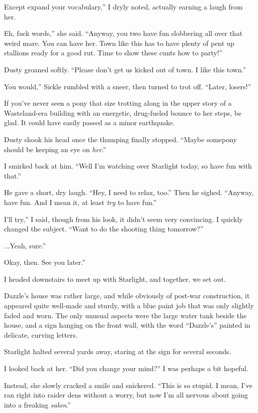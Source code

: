 \leavevmode{}Except expand your vocabulary,” I dryly noted, actually earning a laugh from her.

\leavevmode{}Eh, fuck words,” she said. “Anyway, you two have fun slobbering all over that weird mare. You can have her. Town like this has to have plenty of pent up stallions ready for a good rut. Time to show these cunts how to party!”

Dusty groaned softly. “Please don’t get us kicked out of town. I like this town.”

\leavevmode{}You would,” Sickle rumbled with a sneer, then turned to trot off. “Later, losers!”

If you’ve never seen a pony that size trotting along in the upper story of a Wasteland-era building with an energetic, drug-fueled bounce to her steps, be glad. It could have easily passed as a minor earthquake.

Dusty shook his head once the thumping finally stopped. “Maybe somepony should be keeping an eye on \textit{her}.”

I smirked back at him. “Well I’m watching over Starlight today, so have fun with that.”

He gave a short, dry laugh. “Hey, I need to relax, too.” Then he sighed. “Anyway, have fun. And I mean it, at least \textit{try} to have fun.”

\leavevmode{}I’ll try,” I said, though from his look, it didn’t seem very convincing. I quickly changed the subject. “Want to do the shooting thing tomorrow?”

\leavevmode{}...Yeah, sure.”

\leavevmode{}Okay, then. See you later.”

I headed downstairs to meet up with Starlight, and together, we set out.

Dazzle’s house was rather large, and while obviously of post-war construction, it appeared quite well-made and sturdy, with a blue paint job that was only slightly faded and worn. The only unusual aspects were the large water tank beside the house, and a sign hanging on the front wall, with the word “Dazzle’s” painted in delicate, curving letters.

Starlight halted several yards away, staring at the sign for several seconds.

I looked back at her. “Did you change your mind?” I was perhaps a bit hopeful.

Instead, she slowly cracked a smile and snickered. “This is so stupid. I mean, I’ve ran right into raider dens without a worry, but now I’m all nervous about going into a freaking \textit{salon}.”

